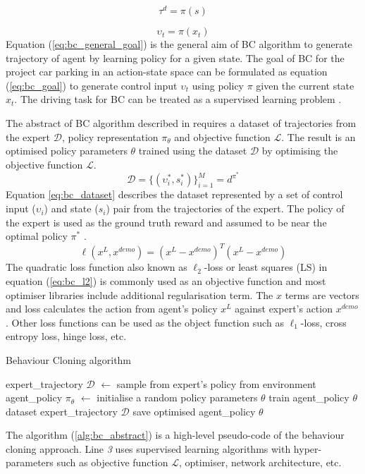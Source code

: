 \documentclass{svproc}
\begin{document}
\begin{equation}
\tau^d = \pi(s)
\label{eq:bc_general_goal}
\end{equation}

\begin{equation}
\upsilon_t = \pi(x_t)
\label{eq:bc_goal}
\end{equation}
Equation (\ref{eq:bc_general_goal}) is the general aim of BC algorithm to generate trajectory of agent by learning policy for a given state. The goal of BC for the project car parking in an action-state space can be formulated as equation (\ref{eq:bc_goal}) to generate control input $\upsilon_t$ using policy $\pi$ given the current state $x_t$. The driving task for BC can be treated as a supervised learning problem \cite{ly2020learning}\cite{osa2018algorithmic}\cite{saksena2019towards}. 

The abstract of BC algorithm described in \cite{osa2018algorithmic} requires a dataset of trajectories from the expert $\mathcal{D}$, policy representation $\pi_\theta$ and objective function $\mathcal{L}$. The result is an optimised policy parameters $\theta$ trained using the dataset $\mathcal{D}$ by optimising the objective function $\mathcal{L}$.
%
\begin{equation}
\mathcal{D} = \{ (\upsilon_i^*, s_i^*) \}^M_{i=1} = d^{\pi^*}
\label{eq:bc_dataset}
\end{equation}
Equation \ref{eq:bc_dataset} describes the dataset represented by a set of control input ($\upsilon_i$) and state ($s_i$) pair from the trajectories of the expert. The policy of the expert is used as the ground truth reward and assumed to be near the optimal policy $\pi^*$ \cite{lecture6789wen}.
\begin{equation}
\ell(x^L,x^{demo}) = (x^L - x^{demo})^T(x^L-x^{demo})
\label{eq:bc_l2}
\end{equation}
The quadratic loss function also known as $\ell_2$-loss or least squares (LS) in equation (\ref{eq:bc_l2}) is commonly used as an objective function and most optimiser libraries include additional regularisation term. The $x$ terms are vectors and loss calculates the action from agent's policy $x^L$ against expert's action $x^{demo}$. Other loss functions can be used as the object function such as $\ell_1$-loss, cross entropy loss, hinge loss, etc.

\begin{algorithm}
  \caption{Behaviour Cloning algorithm}
  \label{alg:bc_abstract}
  \begin{algorithmic}[1]
    \STATE expert\_trajectory $\mathcal{D}$ $\leftarrow$ sample from expert's policy from environment \label{op0}
    \STATE agent\_policy $\pi_\theta$ $\leftarrow$ initialise a random policy parameters $\theta$ \label{op1}
    \STATE train agent\_policy $\theta$ dataset expert\_trajectory $\mathcal{D}$  \label{op2}
    \STATE save optimised agent\_policy $\theta$ \label{op4}
  \end{algorithmic}
\end{algorithm}
The algorithm (\ref{alg:bc_abstract}) is a high-level pseudo-code of the behaviour cloning approach. Line \emph{3} uses supervised learning algorithms with hyper-parameters such as objective function $\mathcal{L}$, optimiser, network architecture, etc.
\end{document}

